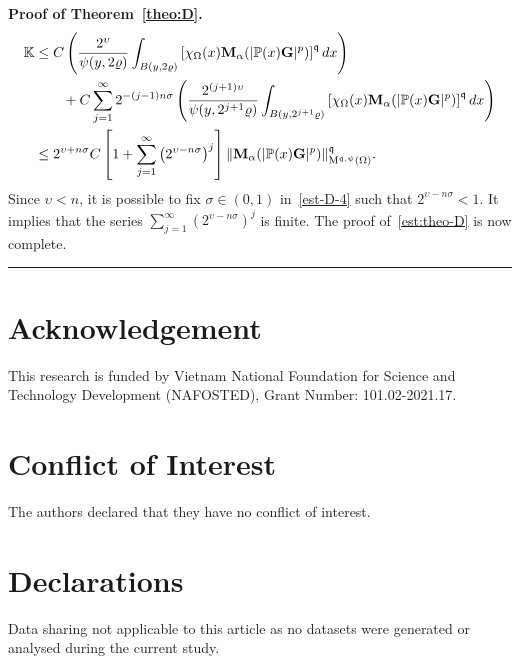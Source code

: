 \documentclass[a4paper, 11pt]{article}
\newenvironment{proof}[1][Proof]{\textbf{#1.} }{\hfill\rule{0.5em}{0.5em}}
\begin{document}
\begin{proof}[Proof of Theorem~\ref{theo:D}]
\begin{align}\label{est-D-4}
\mathbb{K} & \le C \left(\frac{2^{\upsilon}}{\psi(y,2\varrho)}\int_{B(y,2\varrho)} \left[\chi_{\Omega}(x)\mathbf{M}_{\alpha}(|\mathbb{P}(x)\mathbf{G}|^{p})\right]^{\mathfrak{q}} dx\right) \notag \\
& \qquad +  C \sum_{j=1}^{\infty} 2^{-(j-1)n\sigma} \left(\frac{2^{(j+1)\upsilon}}{\psi(y,2^{j+1}\varrho)} \int_{B(y,2^{j+1}\varrho)} \left[\chi_{\Omega}(x)\mathbf{M}_{\alpha}(|\mathbb{P}(x)\mathbf{G}|^{p})\right]^{\mathfrak{q}} dx\right) \notag \\
& \le 2^{\upsilon+n\sigma} C \left[1 + \sum_{j=1}^{\infty} \left(2^{\upsilon-n\sigma}\right)^j\right] \|\mathbf{M}_{\alpha}(|\mathbb{P}(x)\mathbf{G}|^{p})\|_{\mathrm{M}^{\mathfrak{q},\psi}(\Omega)}^{\mathfrak{q}}.
\end{align}
Since $\upsilon < n$, it is possible to fix $\sigma \in (0,1)$ in~\eqref{est-D-4} such that
$2^{\upsilon-n\sigma} < 1$. It implies that the series $\sum_{j=1}^{\infty} \left(2^{\upsilon-n\sigma}\right)^j$ is finite. The proof of~\eqref{est:theo-D} is now complete.
\end{proof}

\section*{Acknowledgement}
This research is funded by Vietnam National Foundation for Science and Technology Development (NAFOSTED), Grant Number: 101.02-2021.17.

\section*{Conflict of Interest}
The authors declared that they have no conflict of interest.

\section*{Declarations}
Data sharing not applicable to this article as no datasets were generated or analysed during the current study.\\
\end{document}
